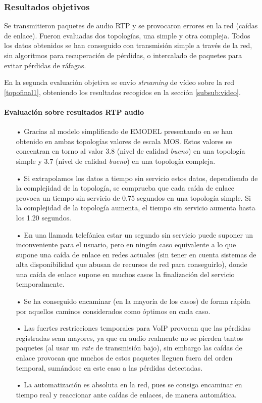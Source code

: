 \documentclass[a4paper,11pt]{book}
\begin{document}
\subsubsection{Resultados objetivos}
Se transmitieron paquetes de audio \ac{RTP} y se provocaron errores en la red (caídas de enlace). Fueron evaluadas dos topologías, una simple y otra compleja. Todos los datos obtenidos se han conseguido con transmisión simple a través de la red, sin algoritmos para recuperación de pérdidas, o intercalado de paquetes para evitar pérdidas de ráfagas. 

En la segunda evaluación objetiva se envío \textit{streaming} de vídeo sobre la red \ref{topofinal1}, obteniendo los resultados recogidos en la sección \ref{subsub:video}.

\paragraph{Evaluación sobre resultados \ac{RTP} audio}

\begin{itemize}
\item[•] Gracias al modelo simplificado de EMODEL presentando en \cite{ramos2005efficient} se han obtenido en ambas topologías valores de escala \ac{MOS}. Estos valores se concentran en torno al valor 3.8 (nivel de calidad \emph{bueno}) en una topología simple y 3.7 (nivel de calidad \emph{bueno}) en una topología compleja.
\item[•] Si extrapolamos los datos a tiempo sin servicio estos datos, dependiendo de la complejidad de la topología, se comprueba que cada caída de enlace provoca un tiempo sin servicio de 0.75 segundos en una topología simple. Si la complejidad de la topología aumenta, el tiempo sin servicio aumenta hasta los 1.20 segundos.
\item[•] En una llamada telefónica estar un segundo sin servicio puede suponer un inconveniente para el usuario, pero en ningún caso equivalente a lo que supone una caída de enlace en redes actuales (sin tener en cuenta sistemas de alta disponibilidad que abusan de recursos de red para conseguirlo), donde una caída de enlace supone en muchos casos la finalización del servicio temporalmente.
\item[•] Se ha conseguido encaminar (en la mayoría de los casos) de forma rápida por aquellos caminos considerados como óptimos en cada caso.
\item[•] Las fuertes restricciones temporales para \ac{VoIP} provocan que las pérdidas registradas sean mayores, ya que en audio realmente no se pierden tantos paquetes (al usar un \textit{rate} de transmisión bajo), sin embargo las caídas de enlace provocan que muchos de estos paquetes lleguen fuera del orden temporal, sumándose en este caso a las pérdidas detectadas.
\item[•] La automatización es absoluta en la red, pues se consiga encaminar en tiempo real y reaccionar ante caídas de enlaces, de manera automática.

\end{itemize}
\end{document}
